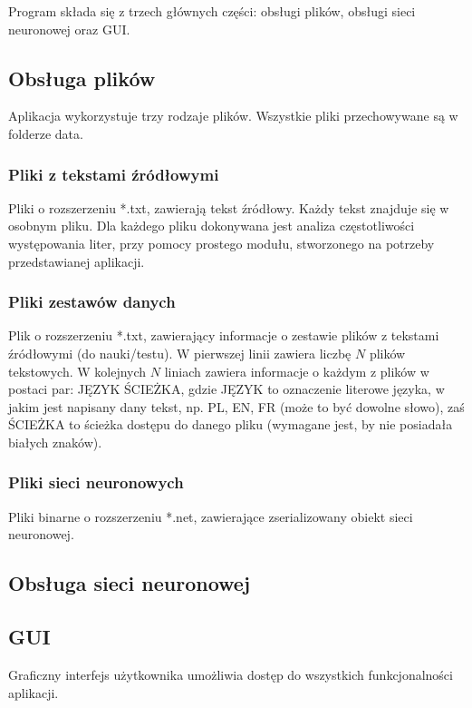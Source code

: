 \documentclass[journal]{IEEEtran}
\begin{document}
Program składa się z trzech głównych części: obsługi plików, obsługi sieci neuronowej oraz GUI.

\subsection{Obsługa plików}
Aplikacja wykorzystuje trzy rodzaje plików. Wszystkie pliki przechowywane są w folderze data.

\subsubsection{Pliki z tekstami źródłowymi}
Pliki o rozszerzeniu *.txt, zawierają tekst źródłowy. Każdy tekst znajduje się w osobnym pliku. Dla każdego pliku
dokonywana jest analiza częstotliwości występowania liter, przy pomocy prostego modułu, stworzonego na potrzeby przedstawianej
aplikacji.

\subsubsection{Pliki zestawów danych}
Plik o rozszerzeniu *.txt, zawierający informacje o zestawie plików z tekstami źródłowymi (do nauki/testu).
W pierwszej linii zawiera liczbę $N$ plików tekstowych. W kolejnych $N$ liniach zawiera informacje o każdym z plików
w postaci par: JĘZYK ŚCIEŻKA, gdzie JĘZYK to oznaczenie literowe języka, w jakim jest napisany dany tekst, np. PL, EN, FR
(może to być dowolne słowo), zaś ŚCIEŻKA to ścieżka dostępu do danego pliku (wymagane jest, by nie posiadała białych znaków).

\subsubsection{Pliki sieci neuronowych}
Pliki binarne o rozszerzeniu *.net, zawierające zserializowany obiekt sieci neuronowej.


\subsection{Obsługa sieci neuronowej}



\subsection{GUI}
Graficzny interfejs użytkownika umożliwia dostęp do wszystkich funkcjonalności aplikacji.
\end{document}
